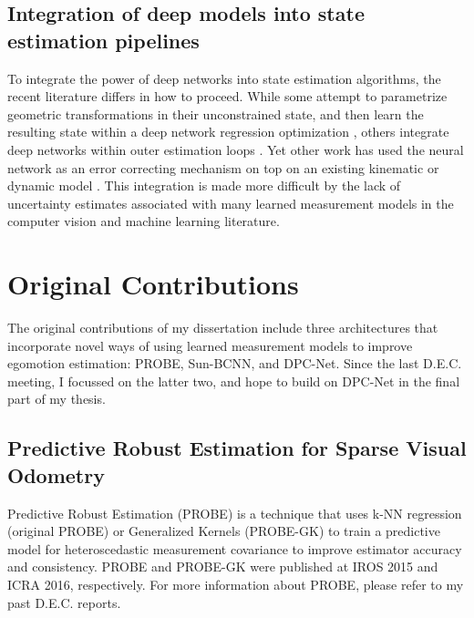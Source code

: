 \subsection{Integration of deep models into state estimation pipelines}
 To integrate the power of deep networks into state estimation algorithms, the recent literature differs in how to proceed. While some attempt to parametrize geometric transformations in their unconstrained state, and then learn the resulting state within a deep network regression optimization \citep{Costante2016-hb, Kendall2015-kh}, others integrate deep networks within outer estimation loops \citep{Haarnoja2016-ph}. Yet other work has used the neural network as an error correcting mechanism on top on an existing kinematic or dynamic model \citep{Punjani2015-pj}. This integration is made more difficult by the lack of uncertainty estimates associated with many learned measurement models in the computer vision and machine learning literature.
 
 
\section{Original Contributions}
The original contributions of my dissertation include three architectures that incorporate novel ways of using learned measurement models to improve egomotion estimation: PROBE, Sun-BCNN, and DPC-Net. Since the last D.E.C. meeting, I focussed on the latter two, and hope to build on DPC-Net in the final part of my thesis.

\subsection{Predictive Robust Estimation for Sparse Visual Odometry}

Predictive Robust Estimation (PROBE) is a technique that uses k-NN regression (original PROBE) or Generalized Kernels \citep{Vega-Brown2014-sb} (PROBE-GK) to train a predictive model for heteroscedastic measurement covariance to improve estimator accuracy and consistency. PROBE \citep{Peretroukhin2015-em} and PROBE-GK \citep{Peretroukhin2016-om} were published at IROS 2015 and ICRA 2016, respectively. For more information about PROBE, please refer to my past D.E.C. reports.

